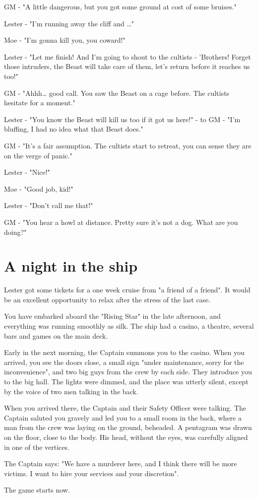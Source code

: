 \documentclass[11pt]{article}
\begin{document}
GM - "A little dangerous, but you got some ground at cost of some bruises."

Lester - "I'm running away the cliff and \ldots{}"

Moe - "I'm gonna kill you, you coward!"

Lester - "Let me finish! And I'm going to shout to the cultists - 'Brothers! Forget those intruders, the Beast will take care of them, let's return before it reaches us too!"

GM - "Ahhh\ldots{} good call. You saw the Beast on a cage before. The cultists hesitate for a moment."

Lester - "You know the Beast will kill us too if it got us here!" - to GM - "I'm bluffing, I had no idea what that Beast does."

GM - "It's a fair assumption. The cultists start to retreat, you can sense they are on the verge of panic."

Lester - "Nice!"

Moe - "Good job, kid!"

Lester - "Don't call me that!"

GM - "You hear a howl at distance. Pretty sure it's not a dog. What are you doing?"

\section{A night in the ship}
\label{sec:one-shot-a-night-in-the-ship}

Lester got some tickets for a one week cruise from "a friend of a friend". It would be an excellent opportunity to relax after the stress of the last case.

You have embarked aboard the "Rising Star" in the late afternoon, and everything was running smoothly as silk. The ship had a casino, a theatre, several bars and games on the main deck.

Early in the next morning, the Captain summons you to the casino. When you arrived, you see the doors close, a small sign "under maintenance, sorry for the inconvenience", and two big guys from the crew by each side. They introduce you to the big hall. The lights were dimmed, and the place was utterly silent, except by the voice of two men talking in the back.

When you arrived there, the Captain and their Safety Officer were talking. The Captain saluted you gravely and led you to a small room in the back, where a man from the crew was laying on the ground, beheaded. A pentagram was drawn on the floor, close to the body. His head, without the eyes, was carefully aligned in one of the vertices.

The Captain says: "We have a murderer here, and I think there will be more victims. I want to hire your services and your discretion". 

The game starts now.
\end{document}

